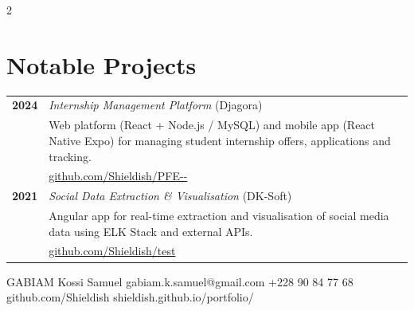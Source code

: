 \documentclass{modernsimplecv}
\newlength{\rightcolwidth}
\begin{document}
\begin{paracol}{2}
\vspace{2em}


\begin{skillsection}{\rightcolwidth}
\end{skillsection}

\bigskip

\vspace{2em}

\begin{minipage}[t]{\rightcolwidth}
\section*{Notable Projects}
\begin{tabular}{>{\footnotesize\bfseries}r >{\footnotesize}p{}}
    2024 & \emph{Internship Management Platform} (Djagora) \\
         & Web platform (React + Node.js / MySQL) and mobile app (React Native Expo) for managing student internship offers, applications and tracking. \\
         & \protect\url{github.com/Shieldish/PFE--} \\[0.5em]
    2021 & \emph{Social Data Extraction \& Visualisation} (DK-Soft) \\
         & Angular app for real-time extraction and visualisation of social media data using ELK Stack and external APIs. \\
         & \protect\url{github.com/Shieldish/test}
\end{tabular}
\end{minipage}

\end{paracol}

\vfill{}

\setlength{\parindent}{0pt}
\begin{minipage}[t]{\textwidth}
\begin{center}\fontfamily{\sfdefault}\selectfont \color{black!70}
{\small GABIAM Kossi Samuel
 gabiam.k.samuel@gmail.com
 +228 90 84 77 68
 github.com/Shieldish
 shieldish.github.io/portfolio/}
\end{center}
\end{minipage}
\end{document}
